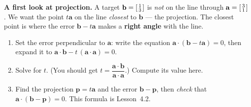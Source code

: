 \documentclass[10pt]{article}
\newcommand{\avec}{\mathbf{a}}
\newcommand{\bb}{\mathbf{b}}
\newcommand{\pp}{\mathbf{p}}
\begin{document}
\begin{tcolorbox}[colback=white, colframe=black!40, title=\textbf{Tier E --- Extension},
    fonttitle=\bfseries, arc=1.5mm, left=3mm, right=3mm, top=2mm, bottom=2mm, breakable]
\textbf{A first look at projection.} A target $\bb=\begin{bsmallmatrix} 1\\3 \end{bsmallmatrix}$ is
\emph{not} on the line through $\avec=\begin{bsmallmatrix} 3\\1 \end{bsmallmatrix}$. We want the point
$t\avec$ on the line \emph{closest} to $\bb$ --- the projection. The closest point is where the error
$\bb-t\avec$ makes a \textbf{right angle} with the line.
\begin{enumerate}[leftmargin=1.7em, itemsep=9pt]
  \item Set the error perpendicular to $\avec$: write the equation $\avec\cdot(\bb-t\avec)=0$, then expand
        it to $\avec\cdot\bb - t\,(\avec\cdot\avec)=0$. 
  \item Solve for $t$. (You should get $t=\dfrac{\avec\cdot\bb}{\avec\cdot\avec}$.) Compute its value here.
  \item Find the projection $\pp=t\avec$ and the error $\bb-\pp$, then \emph{check} that
        $\avec\cdot(\bb-\pp)=0$. This formula is Lesson~4.2. 
\end{enumerate}
\end{tcolorbox}
\end{document}
